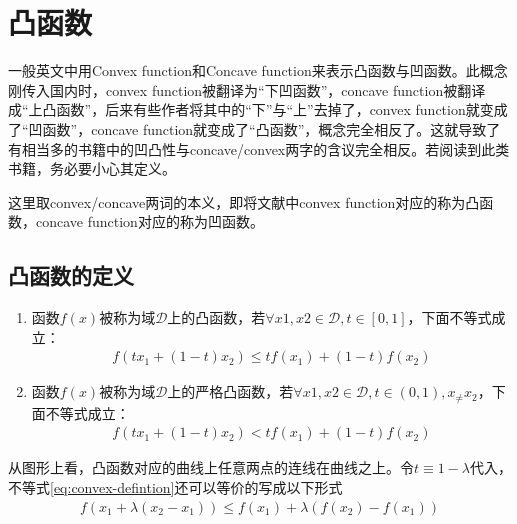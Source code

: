 \chapter{凸函数}
\label{chap:convex-functions}

一般英文中用Convex function和Concave function来表示凸函数与凹函数。此概念刚传入国内时，convex function被翻译为“下凹函数”，concave function被翻译成“上凸函数”，后来有些作者将其中的“下”与“上”去掉了，convex function就变成了“凹函数”，concave function就变成了“凸函数”，概念完全相反了。这就导致了有相当多的书籍中的凹凸性与concave/convex两字的含议完全相反。若阅读到此类书籍，务必要小心其定义。


这里取convex/concave两词的本义，即将文献中convex function对应的称为凸函数，concave function对应的称为凹函数。

\section{凸函数的定义}
\label{sec:definition-of-convexity}

\begin{definition}
  \begin{enumerate}
  \item 函数$f(x)$被称为域$\mathcal{D}$上的凸函数，若$\forall x1,x2\in\mathcal{D}, t\in[0,1]$，下面不等式成立：
    \begin{align}\label{eq:convex-defintion}
      f\left(tx_1+(1-t)x_2\right)\le tf(x_1) + (1-t)f(x_2)
    \end{align}
  \item 函数$f(x)$被称为域$\mathcal{D}$上的严格凸函数，若$\forall x1,x2\in\mathcal{D}, t\in(0,1),x_\ne x_2$，下面不等式成立：
    \begin{align}
      f\left(tx_1+(1-t)x_2\right)< tf(x_1) + (1-t)f(x_2)
    \end{align}
  \end{enumerate}
\end{definition}

从图形上看，凸函数对应的曲线上任意两点的连线在曲线之上。令$t\equiv 1-\lambda$代入，不等式\ref{eq:convex-defintion}还可以等价的写成以下形式
\begin{align*}
  f\left(x_1+\lambda(x_2-x_1)\right)\le f(x_1) + \lambda \left(f(x_2)-f(x_1)\right)
\end{align*}


